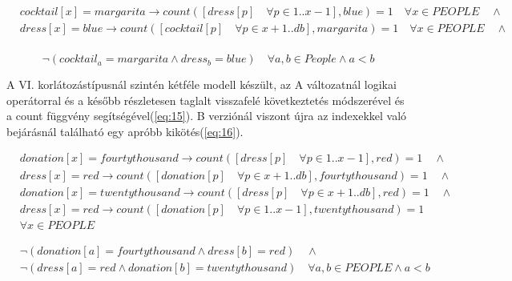\documentclass[12pt,a4paper]{report}
\begin{document}
	\begin{equation} \label{eq:13}
	\begin{aligned}
	&cocktail[x]=margarita \rightarrow count([dress[p] \quad \forall p \in 1..x-1], blue)=1 \quad \forall x \in PEOPLE \quad \wedge \\
	&dress[x]=blue \rightarrow count([cocktail[p] \quad \forall p \in x+1..db], margarita)=1 \quad \forall x \in PEOPLE \quad \wedge \\
	\end{aligned}
	\end{equation}
	
	\begin{equation} \label{eq:14}
	\neg(cocktail_a =margarita \wedge dress_b=blue) \quad \forall a,b \in People \wedge a<b
	\end{equation}

    A VI. korlátozástípusnál szintén kétféle modell készült, az A változatnál logikai 
    operátorral és a később részletesen taglalt visszafelé következtetés módszerével és a count függvény segítségével(\ref{eq:15}).
    B verziónál viszont újra az indexekkel való bejárásnál található egy apróbb kikötés(\ref{eq:16}).

    \begin{equation} \label{eq:15}
    \begin{aligned}  
   	    &donation[x]=fourtythousand \rightarrow count([dress[p] \quad \forall p \in 1..x-1], red)=1 \quad \wedge \\
   	    &dress[x]=red \rightarrow count([donation[p] \quad \forall p \in x+1..db], fourtythousand)=1 \quad \wedge \\
   	    &donation[x]=twentythousand \rightarrow count([dress[p] \quad \forall p \in x+1..db], red)=1 \quad \wedge \\
   	    &dress[x]=red \rightarrow count([donation[p] \quad \forall p \in 1..x-1], twentythousand)=1 \\
        &\forall x \in PEOPLE
    \end{aligned}
    \end{equation}
    
    \begin{equation} \label{eq:16}
    \begin{aligned}
    	&\neg(donation[a]=fourtythousand \wedge dress[b]=red) \quad \wedge \\
    	&\neg(dress[a]=red \wedge donation[b]=twentythousand) \quad \forall a,b \in PEOPLE \wedge a<b \\
    \end{aligned}
    \end{equation}
\end{document}
